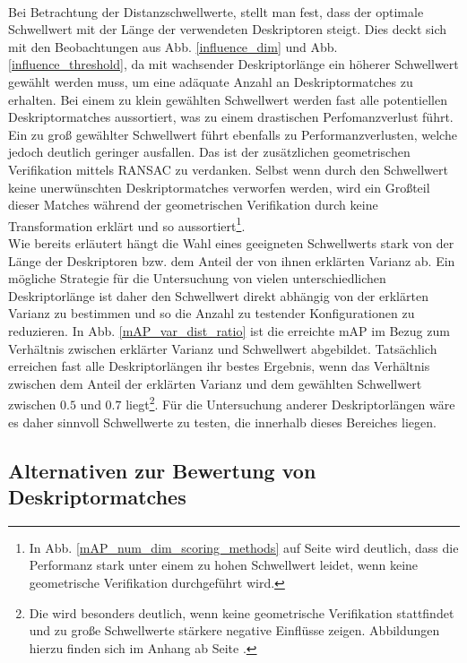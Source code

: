 \\
Bei Betrachtung der Distanzschwellwerte, stellt man fest, dass der optimale Schwellwert mit der Länge der verwendeten Deskriptoren steigt. Dies deckt sich mit den Beobachtungen aus Abb. \ref{influence_dim} und Abb. \ref{influence_threshold}, da mit wachsender Deskriptorlänge ein höherer Schwellwert gewählt werden muss, um eine adäquate Anzahl an Deskriptormatches zu erhalten. Bei einem zu klein gewählten Schwellwert werden fast alle potentiellen Deskriptormatches aussortiert, was zu einem drastischen Perfomanzverlust führt. Ein zu groß gewählter Schwellwert führt ebenfalls zu Performanzverlusten, welche jedoch deutlich geringer ausfallen. Das ist der zusätzlichen geometrischen Verifikation mittels RANSAC zu verdanken. Selbst wenn durch den Schwellwert keine unerwünschten Deskriptormatches verworfen werden, wird ein Großteil dieser Matches während der geometrischen Verifikation durch keine Transformation erklärt und so aussortiert\footnote{In Abb. \ref{mAP_num_dim_scoring_methods} auf Seite \pageref{mAP_num_dim_scoring_methods} wird deutlich, dass die Performanz stark unter einem zu hohen Schwellwert leidet, wenn keine geometrische Verifikation durchgeführt wird.}. \\
Wie bereits erläutert hängt die Wahl eines geeigneten Schwellwerts stark von der Länge der Deskriptoren bzw. dem Anteil der von ihnen erklärten Varianz ab. Ein mögliche Strategie für die Untersuchung von vielen unterschiedlichen Deskriptorlänge ist daher den Schwellwert direkt abhängig von der erklärten Varianz zu bestimmen und so die Anzahl zu testender Konfigurationen zu reduzieren. In Abb. \ref{mAP_var_dist_ratio} ist die erreichte mAP im Bezug zum Verhältnis zwischen erklärter Varianz und Schwellwert abgebildet. Tatsächlich erreichen fast alle Deskriptorlängen ihr bestes Ergebnis, wenn das Verhältnis zwischen dem Anteil der erklärten Varianz und dem gewählten Schwellwert zwischen $0.5$ und $0.7$ liegt\footnote{Die wird besonders deutlich, wenn keine geometrische Verifikation stattfindet und zu große Schwellwerte stärkere negative Einflüsse zeigen. Abbildungen hierzu finden sich im Anhang ab Seite \pageref{mAP_var_dist_ratio_alternative_scoring}.}. Für die Untersuchung anderer Deskriptorlängen wäre es daher sinnvoll Schwellwerte zu testen, die innerhalb dieses Bereiches liegen.

\subsection{Alternativen zur Bewertung von Deskriptormatches}\label{metric_experiment}

